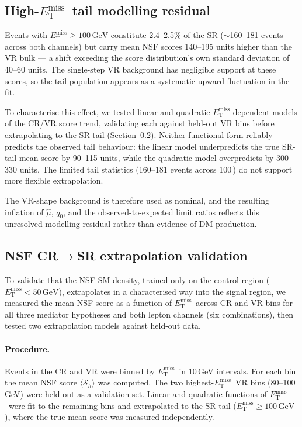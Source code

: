 \documentclass[11pt,a4paper,twocolumn]{article}
\newcommand{\GeV}{\text{GeV}}
\newcommand{\MET}{\ensuremath{E_{\mathrm{T}}^{\mathrm{miss}}}}
\begin{document}
\subsection{High-\MET\ tail modelling residual}
\label{sec:met-tail}

Events with $\MET\ge100\,\GeV$ constitute 2.4--2.5\% of the SR
($\sim$160--181 events across both channels) but carry mean NSF scores
140--195 units higher than the VR bulk --- a shift exceeding the score
distribution's own standard deviation of 40--60 units.
The single-step VR background has negligible support at these scores,
so the tail population appears as a systematic upward fluctuation in
the fit.

To characterise this effect, we tested linear and quadratic
\MET-dependent models of the CR/VR score trend, validating each against
held-out VR bins before extrapolating to the SR tail
(Section~\ref{sec:extrapolation-validation}).
Neither functional form reliably predicts the observed tail behaviour:
the linear model underpredicts the true SR-tail mean score by 90--115
units, while the quadratic model overpredicts by 300--330 units. The
limited tail statistics (160--181 events across 100\,\GeV) do not
support more flexible extrapolation.

The VR-shape background is therefore used as nominal, and the resulting
inflation of $\hat\mu$, $q_0$, and the observed-to-expected limit ratios
reflects this unresolved modelling residual rather than evidence of DM
production.

\subsection{NSF CR$\to$SR extrapolation validation}
\label{sec:extrapolation-validation}

To validate that the NSF SM density, trained only on the control region
($\MET<50\,\GeV$), extrapolates in a characterised way into the signal
region, we measured the mean NSF score as a function of \MET\ across CR
and VR bins for all three mediator hypotheses and both lepton channels
(six combinations), then tested two extrapolation models against
held-out data.

\paragraph{Procedure.}
Events in the CR and VR were binned by \MET\ in 10\,GeV intervals.
For each bin the mean NSF score $\langle\mathcal{S}_h\rangle$ was
computed. The two highest-\MET\ VR bins (80--100\,GeV) were held out
as a validation set. Linear and quadratic functions of \MET\ were fit
to the remaining bins and extrapolated to the SR tail
($\MET\ge100\,\GeV$), where the true mean score was measured
independently.
\end{document}
